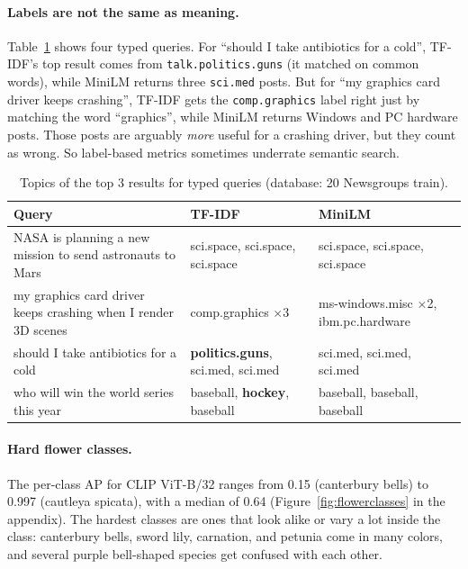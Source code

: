 \documentclass{article}
\begin{document}
\paragraph{Labels are not the same as meaning.} Table~\ref{tab:qual} shows four typed queries. For ``should I take antibiotics for a cold'', TF-IDF's top result comes from \texttt{talk.\allowbreak politics.\allowbreak guns} (it matched on common words), while MiniLM returns three \texttt{sci.\allowbreak med} posts. But for ``my graphics card driver keeps crashing'', TF-IDF gets the \texttt{comp.\allowbreak graphics} label right just by matching the word ``graphics'', while MiniLM returns Windows and PC hardware posts. Those posts are arguably \emph{more} useful for a crashing driver, but they count as wrong. So label-based metrics sometimes underrate semantic search.

\begin{table}[h]
\centering\small
\caption{Topics of the top 3 results for typed queries (database: 20 Newsgroups train).}
\label{tab:qual}
\begin{tabular}{@{}p{4.1cm}p{4.3cm}p{4.3cm}@{}}
\toprule
Query & TF-IDF & MiniLM \\
\midrule
NASA is planning a new mission to send astronauts to Mars & sci.space, sci.space, sci.space & sci.space, sci.space, sci.space \\
my graphics card driver keeps crashing when I render 3D scenes & comp.graphics $\times$3 & ms-windows.misc $\times$2, ibm.pc.hardware \\
should I take antibiotics for a cold & \textbf{politics.guns}, sci.med, sci.med & sci.med, sci.med, sci.med \\
who will win the world series this year & baseball, \textbf{hockey}, baseball & baseball, baseball, baseball \\
\bottomrule
\end{tabular}
\end{table}

\paragraph{Hard flower classes.} The per-class AP for CLIP ViT-B/32 ranges from 0.15 (canterbury bells) to 0.997 (cautleya spicata), with a median of 0.64 (Figure~\ref{fig:flowerclasses} in the appendix). The hardest classes are ones that look alike or vary a lot inside the class: canterbury bells, sword lily, carnation, and petunia come in many colors, and several purple bell-shaped species get confused with each other.
\end{document}

